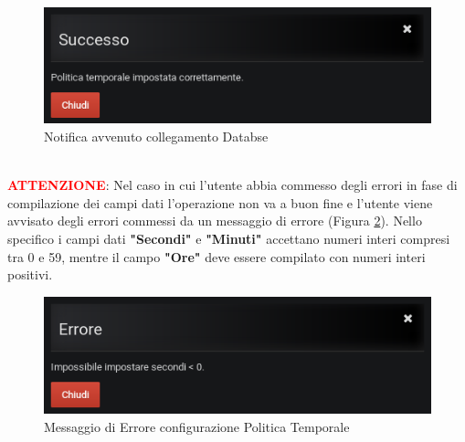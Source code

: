 \begin{figure}[H]
	\begin{center}
		\includegraphics[scale=0.6]{./images/NotificaPolicy.png}
		 \caption{Notifica avvenuto collegamento Databse}	
		 \label{NotificaPolicy}
	\end{center}
\end{figure}

~\\
\textbf{\textcolor{red}{ATTENZIONE}}: Nel caso in cui l'utente abbia commesso degli errori in fase di compilazione dei campi dati l'operazione non va a buon fine e l'utente viene avvisato degli errori commessi da un messaggio di errore (Figura \ref{ErrorePolicy}). Nello specifico i campi dati \textbf{"Secondi"} e \textbf{"Minuti"} accettano numeri interi compresi tra 0 e 59, mentre il campo \textbf{"Ore"} deve essere compilato con numeri interi positivi.

\begin{figure}[H]
	\begin{center}
		\includegraphics[scale=0.6]{./images/ErrorePolicy.png}
		 \caption{Messaggio di Errore configurazione Politica Temporale}	
		 \label{ErrorePolicy}
	\end{center}
\end{figure}

